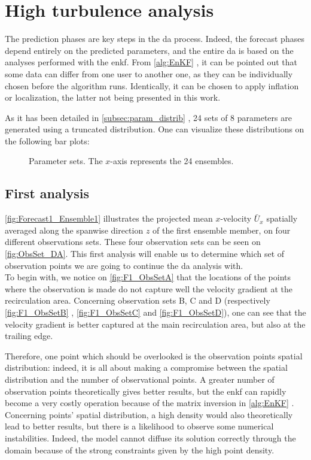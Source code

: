 \documentclass[12pt,twoside]{report}
\newcommand{\Autoref}[1]{%
  \begingroup%
    \def\chapterautorefname{Chapter}%
    \def\sectionautorefname{Section}%
    \def\subsectionautorefname{Subsection}%
    \def\subsubsectionautorefname{Subsubsection}%
    \def\paragraphautorefname{Paragraph}%
    \def\tableautorefname{Table}%
    \def\equationautorefname{Equation}%
    \def\algorithmautorefname{Algorithm}%
    \def\lineautorefname{Step}%
  \autoref{#1}%
  \endgroup%
}
\newcommand{\Autorefs}[1]{%
  \begingroup%
    \def\chapterautorefname{Chapters}%
    \def\figureautorefname{Figures}%
    \def\sectionautorefname{Sections}%
    \def\subsectionautorefname{Subsections}%
    \def\subsubsectionautorefname{Subsubsections}%
    \def\paragraphautorefname{Paragraphs}%
    \def\tableautorefname{Tables}%
    \def\equationautorefname{Equations}%
    \def\algorithmautorefname{Algorithms}%
    \def\lineautorefname{Lines}%
  \autoref{#1}%
  \endgroup%
}
\begin{document}
\clearpage


\section{High turbulence analysis}
The prediction phases are key steps in the \gls{da} process. Indeed, the forecast phases depend entirely on the predicted parameters, and the entire \gls{da} is based on the analyses performed with the \gls{enkf}. From \Autoref{alg:EnKF}, it can be pointed out that some data can differ from one user to another one, as they can be individually chosen before the algorithm runs. Identically, it can be chosen to apply inflation or localization, the latter not being presented in this work. 

As it has been detailed in \Autoref{subsec:param_distrib}, 24 sets of 8 parameters are generated using a truncated distribution. One can visualize these distributions on the following bar plots:
\begin{figure}[h!]
    \centering
    
    \caption{Parameter sets. The $x$-axis represents the 24 ensembles.}
    \label{fig:enter-label}
\end{figure}



\subsection{First analysis}
\autoref{fig:Forecast1_Ensemble1} illustrates the projected mean $x$-velocity $\bar{U}_x$ spatially averaged along the spanwise direction $z$ of the first ensemble member, on four different observations sets. These four observation sets can be seen on \autoref{fig:ObsSet_DA}. This first analysis will enable us to determine which set of observation points we are going to continue the \gls{da} analysis with. \\

To begin with, we notice on \autoref{fig:F1_ObsSetA} that the locations of the points where the observation is made do not capture well the velocity gradient at the recirculation area. Concerning observation sets B, C and D (respectively \Autorefs{fig:F1_ObsSetB}, \ref{fig:F1_ObsSetC} and \ref{fig:F1_ObsSetD}), one can see that the velocity gradient is better captured at the main recirculation area, but also at the trailing edge. 

\clearpage

Therefore, one point which should be overlooked is the observation points spatial distribution: indeed, it is all about making a compromise between the spatial distribution and the number of observational points. A greater number of observation points theoretically gives better results, but the \gls{enkf} can rapidly become a very costly operation because of the matrix inversion in \Autoref{alg:EnKF}. Concerning points' spatial distribution, a high density would also theoretically lead to better results, but there is a likelihood to observe some numerical instabilities. Indeed, the model cannot diffuse its solution correctly through the domain because of the strong constraints given by the high point density. \\
\end{document}
